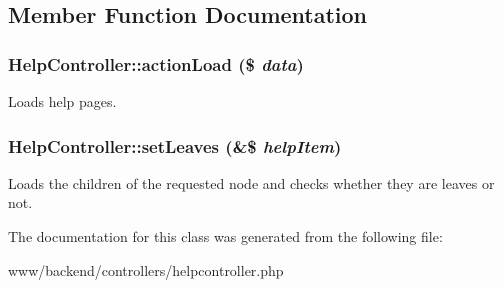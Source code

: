 \subsection{Member Function Documentation}
\hypertarget{classHelpController_a81ee93376ed7a4a11f1ff231d3c2d8fb}{
\subsubsection[{actionLoad}]{\setlength{\rightskip}{0pt plus 5cm}HelpController::actionLoad (\$ {\em data})}}
\label{classHelpController_a81ee93376ed7a4a11f1ff231d3c2d8fb}
Loads help pages. \hypertarget{classHelpController_a5c4cbecffce428a0a98fe3cad78fd83d}{
\subsubsection[{setLeaves}]{\setlength{\rightskip}{0pt plus 5cm}HelpController::setLeaves (\&\$ {\em helpItem})}}
\label{classHelpController_a5c4cbecffce428a0a98fe3cad78fd83d}
Loads the children of the requested node and checks whether they are leaves or not. 

The documentation for this class was generated from the following file:\begin{DoxyCompactItemize}
\item 
www/backend/controllers/helpcontroller.php\end{DoxyCompactItemize}
